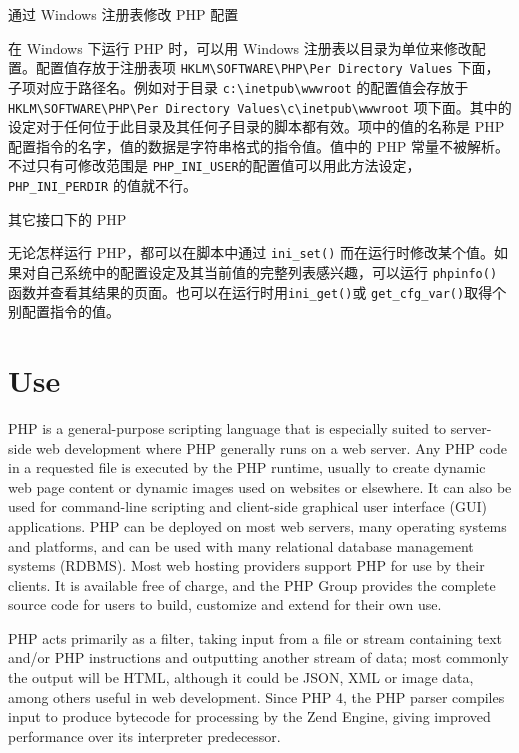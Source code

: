 \begin{compactitem}
\item 通过 Windows 注册表修改 PHP 配置 

在 Windows 下运行 PHP 时，可以用 Windows 注册表以目录为单位来修改配置。配置值存放于注册表项 \texttt{HKLM{\textbackslash}SOFTWARE{\textbackslash}PHP{\textbackslash}Per Directory Values} 下面，子项对应于路径名。例如对于目录 \texttt{c:{\textbackslash}inetpub{\textbackslash}wwwroot} 的配置值会存放于 \texttt{HKLM{\textbackslash}SOFTWARE{\textbackslash}PHP{\textbackslash}Per Directory Values{\textbackslash}c{\textbackslash}inetpub{\textbackslash}wwwroot} 项下面。其中的设定对于任何位于此目录及其任何子目录的脚本都有效。项中的值的名称是 PHP 配置指令的名字，值的数据是字符串格式的指令值。值中的 PHP 常量不被解析。不过只有可修改范围是 \texttt{PHP\_INI\_USER}的配置值可以用此方法设定，\texttt{PHP\_INI\_PERDIR} 的值就不行。

\item 其它接口下的 PHP

无论怎样运行 PHP，都可以在脚本中通过 \texttt{ini\_set()} 而在运行时修改某个值。如果对自己系统中的配置设定及其当前值的完整列表感兴趣，可以运行 \texttt{phpinfo()} 函数并查看其结果的页面。也可以在运行时用\texttt{ini\_get()}或 \texttt{get\_cfg\_var()}取得个别配置指令的值。

\end{compactitem}





\chapter{Use}


PHP is a general-purpose scripting language that is especially suited to server-side web development where PHP generally runs on a web server. Any PHP code in a requested file is executed by the PHP runtime, usually to create dynamic web page content or dynamic images used on websites or elsewhere. It can also be used for command-line scripting and client-side graphical user interface (GUI) applications. PHP can be deployed on most web servers, many operating systems and platforms, and can be used with many relational database management systems (RDBMS). Most web hosting providers support PHP for use by their clients. It is available free of charge, and the PHP Group provides the complete source code for users to build, customize and extend for their own use.


PHP acts primarily as a filter, taking input from a file or stream containing text and/or PHP instructions and outputting another stream of data; most commonly the output will be HTML, although it could be JSON, XML or image data, among others useful in web development. Since PHP 4, the PHP parser compiles input to produce bytecode for processing by the Zend Engine, giving improved performance over its interpreter predecessor.

